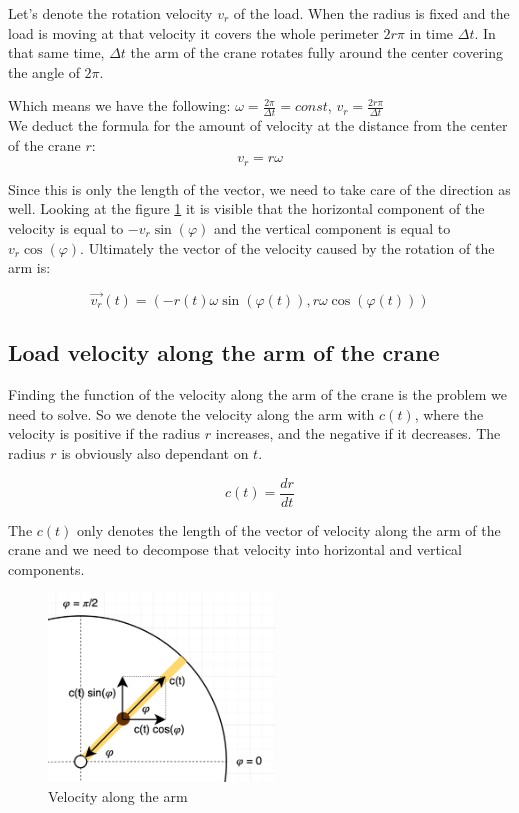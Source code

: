 \documentclass[11pt]{article}
\begin{document}
Let's denote the rotation velocity $v_r$ of the load. When the radius is fixed and the load is moving at that velocity it covers the whole perimeter $2r\pi$ in time $\Delta t$. In that same time, $\Delta t$ the arm of the crane rotates fully around the center covering the angle of $2\pi$.

Which means we have the following: \( \omega = \frac{2\pi}{\Delta t} = const \), \( v_r = \frac{2r\pi}{\Delta t} \)\\

We deduct the formula for the amount of velocity at the distance from the center of the crane $r$:
\[ v_r = r\omega \]

Since this is only the length of the vector, we need to take care of the direction as well. Looking at the figure \ref{fig:rot_velocity} it is visible that the horizontal component of the velocity is equal to $-v_r\sin(\varphi)$ and the vertical component is equal to $v_r\cos(\varphi)$. Ultimately the vector of the velocity caused by the rotation of the arm is:

\[ \vec{v_r}(t) = (-r(t)\omega \sin(\varphi(t)), r\omega \cos(\varphi(t))) \]

\subsection{Load velocity along the arm of the crane}

Finding the function of the velocity along the arm of the crane is the problem we need to solve. So we denote the velocity along the arm with $c(t)$, where the velocity is positive if the radius $r$ increases, and the negative if it decreases. The radius $r$ is obviously also dependant on $t$.

\[ c(t) = \frac{dr}{dt} \]

The $c(t)$ only denotes the length of the vector of velocity along the arm of the crane and we need to decompose that velocity into horizontal and vertical components.

\begin{figure}[H]
\centering
\includegraphics[width=6cm]{arm_velocity.jpg}
\caption{Velocity along the arm}
\label{fig:rot_velocity}
\end{figure}
\end{document}
